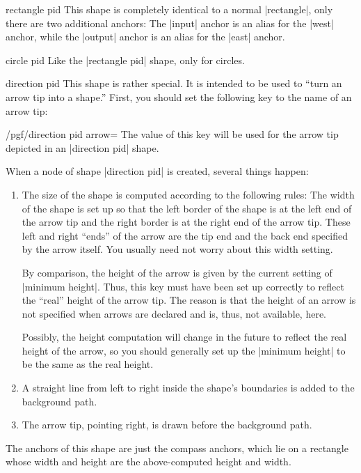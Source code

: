 \documentclass[a4paper]{ltxdoc}
\begin{document}
\begin{shape}{rectangle pid}
 This shape is completely identical to a normal |rectangle|, only
 there are two additional anchors: The |input| anchor is an alias for
 the |west| anchor, while the |output| anchor is an alias for the
 |east| anchor.
\end{shape}

\begin{shape}{circle pid}
 Like the |rectangle pid| shape, only for circles.
\end{shape}

\begin{shape}{direction pid}
 This shape is rather special. It is intended to be used to ``turn an
 arrow tip into a shape.'' First, you should set the following key to
 the name of an arrow tip:
 \begin{key}{/pgf/direction pid arrow=}
  The value of this key will be used for the arrow tip depicted in
  an |direction pid| shape.
 \end{key}
 When a node of shape |direction pid| is created, several things
 happen:
 \begin{enumerate}
  \item The size of the shape is computed according to the following
        rules: The width of the shape is set up so that the left border of
        the shape is at the left end of the arrow tip and the right border
        is at the right end of the arrow tip. These left and right
        ``ends'' of the arrow are the tip end and the back end specified
        by the arrow itself. You usually need not worry about this width
        setting.

        By comparison, the height of the arrow is given by the current
        setting of |minimum height|. Thus, this key must have been set up
        correctly to reflect the ``real'' height of the arrow tip. The
        reason is that the height of an arrow is not specified when arrows
        are declared and is, thus, not available, here.

        Possibly, the height computation will change in the future to
        reflect the real height of the arrow, so you should generally
        set up the |minimum height| to be the same as the real height.
  \item A straight line from left to right inside the shape's
        boundaries is added to the background path.
  \item The arrow tip, pointing right, is drawn before the background
        path.
 \end{enumerate}
 The anchors of this shape are just the compass anchors, which lie on
 a rectangle whose width and height are the above-computed height and
 width.


\end{shape}
\end{document}
